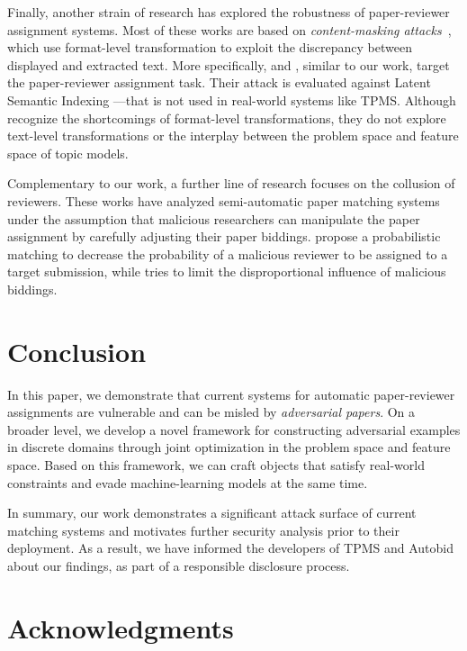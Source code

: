 \documentclass[letterpaper,twocolumn,10pt]{article}
\begin{document}
Finally, another strain of research has explored the robustness of paper-reviewer assignment systems. 
Most of these works are based on \emph{content-masking attacks}~\cite{markwood-17-pdf, tran-19-pdfphantom}, which use format-level transformation to exploit the discrepancy between displayed and extracted text.
More specifically, \citet{markwood-17-pdf} and \citet{tran-19-pdfphantom}, similar to our work, target the paper-reviewer assignment task.
Their attack is evaluated against Latent Semantic Indexing \cite{deerwester-90-indexing}---that is not used in real-world systems like TPMS. 
Although \citet{tran-19-pdfphantom} recognize the shortcomings of format-level transformations, they do not explore text-level transformations or the interplay between the problem space and feature space of topic models. 

Complementary to our work, a further line of research focuses on the collusion of reviewers. These works have analyzed semi-automatic paper matching systems under the assumption that malicious researchers can manipulate the paper assignment by carefully adjusting their paper biddings.
\citet{jecmen-20-mitigating} propose a probabilistic matching to decrease the probability of a malicious reviewer to be assigned to a target submission, while \citet{wu-21-making} tries to limit the disproportional influence of malicious biddings.
 \section{Conclusion}
\label{sec:conclusion}

In this paper, we demonstrate that current systems for automatic paper-reviewer assignments are vulnerable and can be misled by \emph{adversarial papers}. On a broader level, we develop a novel framework for constructing adversarial examples in discrete domains through joint optimization in the problem space and feature space. Based on this framework, we can craft objects that satisfy real-world constraints and evade machine-learning models at the same time.

In summary, our work demonstrates a significant attack surface of current matching systems and motivates further security analysis prior to their deployment. As a result, we have informed the developers of TPMS and Autobid about our findings, as part of a responsible disclosure process.
 \clearpage
\section*{Acknowledgments}
\end{document}
